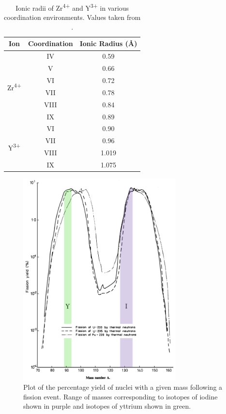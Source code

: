 \begin{table}[htp]
\onehalfspacing
\centering
\caption{Ionic radii of Zr\textsuperscript{4+} and Y\textsuperscript{3+} in various coordination environments. Values taken from \cite{Shannon1976}.}
\label{figure:ionicradii}
\begin{tabular}{ccc}
\hline
Ion & Coordination & Ionic Radius (\r{A}) \\ \hline
\multicolumn{1}{c|}{\multirow{6}{*}{Zr\textsuperscript{4+}}} & \multicolumn{1}{c|}{IV} & 0.59 \\
\multicolumn{1}{c|}{} & \multicolumn{1}{c|}{V} & 0.66 \\
\multicolumn{1}{c|}{} & \multicolumn{1}{c|}{VI} & 0.72 \\
\multicolumn{1}{c|}{} & \multicolumn{1}{c|}{VII} & 0.78 \\
\multicolumn{1}{c|}{} & \multicolumn{1}{c|}{VIII} & 0.84 \\
\multicolumn{1}{c|}{} & \multicolumn{1}{c|}{IX} & 0.89 \\ \hline
\multicolumn{1}{c|}{\multirow{4}{*}{Y\textsuperscript{3+}}} & \multicolumn{1}{c|}{VI} & 0.90 \\
\multicolumn{1}{c|}{} & \multicolumn{1}{c|}{VII} & 0.96 \\
\multicolumn{1}{c|}{} & \multicolumn{1}{c|}{VIII} & 1.019 \\
\multicolumn{1}{c|}{} & \multicolumn{1}{c|}{IX} & 1.075 \\ \hline
\end{tabular}
\end{table}

\begin{figure}[htp]
\centering
\includegraphics[height=11cm]{images/fissionyield.jpg}
\caption{Plot of the percentage yield of nuclei with a given mass following a fission event. Range of masses corresponding to isotopes of iodine shown in purple and isotopes of yttrium shown in green.}
\label{figure:fissionyield}
\end{figure}

